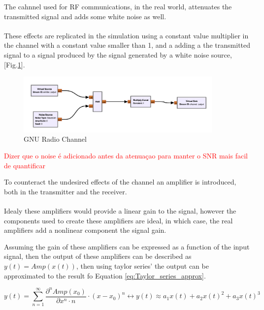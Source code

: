 The cahnnel used for RF communications, in the real world, attenuates the transmitted signal 
and adds some white noise as well. 

\paragraph{}
These effects are replicated in the simulation using a constant value multiplier in 
the channel with a constant value smaller than 1, and a adding a the transmitted signal to 
a signal produced by the signal generated by a white noise source, [Fig.\ref{fig:Gnu_Channel}].

\begin{figure}[H]
    \centering
    \includegraphics*[width=0.9\textwidth]{Images/GNU_Channel.png}
    \caption{GNU Radio Channel}
    \label{fig:Gnu_Channel}
\end{figure}
\textcolor{red}{Dizer que o noise é adicionado antes da atenuaçao para manter o SNR mais facil de quantificar}

To counteract the undesired effects of the channel an amplifier is introduced, both 
in the transmitter and the receiver.

\paragraph{}
Idealy these amplifiers would provide a linear gain to the signal, however the components 
used to create these amplifiers are ideal, in which case, the real amplifiers add a nonlinear 
component the signal gain.

Assuming the gain of these amplifiers can be expressed as a function of the input signal, 
then the output of these amplifiers can be described as \(y(t) = Amp(x(t))\), then using 
taylor series' the output can be approximated to the result fo Equation \ref{eq:Taylor_series_approx}.

\begin{equation}
    y(t) = \sum_{n=1}^{\infty} \frac{\partial^n Amp(x_0)}{\partial x^n \cdot n} \cdot (x - x_0)^n \leftrightarrow y(t) \approx a_1x(t) + a_2{x(t)}^2 + a_3{x(t)}^3
    \label{eq:Taylor_series_approx}
\end{equation}

